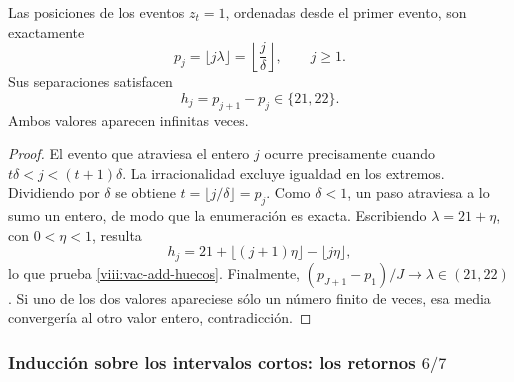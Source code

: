 \begin{theorem}
\label{viii:vac-add-teorema-primario}
Las posiciones de los eventos \(z_t=1\), ordenadas desde el primer
evento, son exactamente
\begin{equation}
 p_j=\lfloor j\lambda\rfloor
     =\left\lfloor\frac j\delta\right\rfloor,
 \qquad j\geq1.
 \label{viii:vac-add-posiciones}
\end{equation}
Sus separaciones satisfacen
\begin{equation}
 h_j=p_{j+1}-p_j\in\{21,22\}.
 \label{viii:vac-add-huecos}
\end{equation}
Ambos valores aparecen infinitas veces.
\end{theorem}
\begin{proof}
El evento que atraviesa el entero \(j\) ocurre precisamente cuando
\(t\delta<j<(t+1)\delta\). La irracionalidad excluye igualdad en
los extremos. Dividiendo por \(\delta\) se obtiene
\(t=\lfloor j/\delta\rfloor=p_j\). Como \(\delta<1\), un paso
atraviesa a lo sumo un entero, de modo que la enumeración es exacta.
Escribiendo \(\lambda=21+\eta\), con \(0<\eta<1\), resulta
\[
 h_j=21+\lfloor(j+1)\eta\rfloor-\lfloor j\eta\rfloor,
\]
lo que prueba \eqref{viii:vac-add-huecos}. Finalmente,
\((p_{J+1}-p_1)/J\to\lambda\in(21,22)\). Si uno de los dos valores
apareciese sólo un número finito de veces, esa media convergería al
otro valor entero, contradicción.
\end{proof}

\subsubsection{Inducción sobre los intervalos cortos: los retornos \(6/7\)}
\label{viii:vac-add-secundarios}

